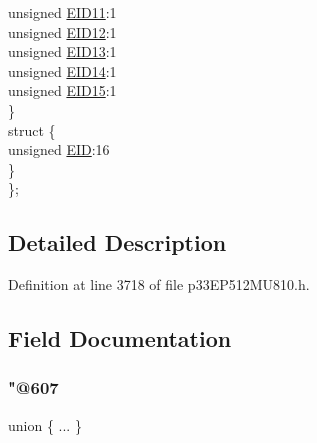 \begin{DoxyCompactItemize}
\begin{tabbing}
\>\>unsigned \hyperlink{structtag_c1_r_x_f0_e_i_d_b_i_t_s_a710bdb0d602deb021b0be99066008018}{EID11}:1\\
\>\>unsigned \hyperlink{structtag_c1_r_x_f0_e_i_d_b_i_t_s_aa347bb85867bd8d4e0124f7cff8c6472}{EID12}:1\\
\>\>unsigned \hyperlink{structtag_c1_r_x_f0_e_i_d_b_i_t_s_a37d5f3edcbf6ef62f848fd4f3c584f79}{EID13}:1\\
\>\>unsigned \hyperlink{structtag_c1_r_x_f0_e_i_d_b_i_t_s_a7ffc0b0e0d99b8476b6f9a45337c17ab}{EID14}:1\\
\>\>unsigned \hyperlink{structtag_c1_r_x_f0_e_i_d_b_i_t_s_a293cd7dc1746257fa75a60cbd9383cd7}{EID15}:1\\
\>\} \\
\>struct \{\\
\>\>unsigned \hyperlink{structtag_c1_r_x_f0_e_i_d_b_i_t_s_ae80b378c9141f7c03e0b4e55b5f4b54d}{EID}:16\\
\>\} \\
\}; \\

\end{tabbing}\end{DoxyCompactItemize}


\subsection{Detailed Description}


Definition at line 3718 of file p33\+E\+P512\+M\+U810.\+h.



\subsection{Field Documentation}
\mbox{\label{structtag_c1_r_x_f0_e_i_d_b_i_t_s_ae74e85a0aad30f1ae6ff2a0ec9c846a5}} 
\subsubsection{\texorpdfstring{"@607}{@607}}
{\footnotesize\ttfamily union \{ ... \} }

\mbox{\label{structtag_c1_r_x_f0_e_i_d_b_i_t_s_ae80b378c9141f7c03e0b4e55b5f4b54d}} 
